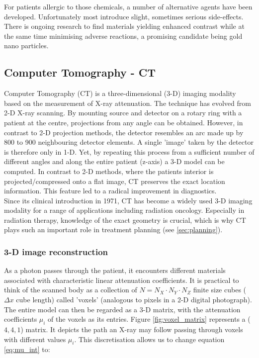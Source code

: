 For patients allergic to those chemicals, a number of alternative agents have been developed.
Unfortunately most introduce slight, sometimes serious side-effects.
There is ongoing research to find materials yielding enhanced contrast while at the same time minimising adverse reactions, a promising candidate being gold nano particles. \cite{Podgorsak, Maidment2014}


\subsection{Computer Tomography - CT}

Computer Tomography (CT) is a three-dimensional (3-D) imaging modality based on the measurement of X-ray attenuation.
The technique has evolved from 2-D X-ray scanning.
By mounting source and detector on a rotary ring with a patient at the centre, projections from any angle can be obtained.
However, in contrast to 2-D projection methods, the detector resembles an arc made up by 800 to 900 neighbouring detector elements.
A single 'image' taken by the detector is therefore only in 1-D.
Yet, by repeating this process from a sufficient number of different angles and along the entire patient (z-axis) a 3-D model can be computed.
In contrast to 2-D methods, where the patients interior is projected/compressed onto a flat image, CT preserves the exact location information. This feature led to a radical improvement in diagnostics.	 \\

Since its clinical introduction in 1971, CT has become a widely used 3-D imaging modality for a range of applications including radiation oncology. Especially in radiation therapy, knowledge of the exact geometry is crucial, which is why CT plays such an important role in treatment planning (see \ref{sec:planning}). \cite{Podgorsak, Maidment2014}

\subsubsection{3-D image reconstruction}
As a photon passes through the patient, it encounters different materials associated with characteristic linear attenuation coefficients.
It is practical to think of the scanned body as a collection of $N = N_X\cdot N_Y\cdot N_Z$ finite size cubes ($\Delta x$ cube length) called 'voxels' (analogous to pixels in a 2-D digital photograph).
The entire model can then be regarded as a 3-D matrix, with the attenuation coefficients $\mu_i$ of the voxels as its entries.
Figure \ref{fig:voxel_matrix} represents a ($4, 4, 1$) matrix.
It depicts the path an X-ray may follow passing through voxels with different values $\mu_i$.
This discretisation allows us to change equation \ref{eq:mu_int} to:

